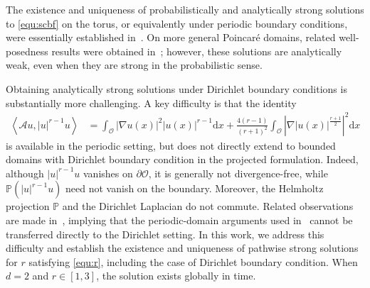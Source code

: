 \documentclass[11pt, reqno]{amsart}
\theoremstyle{definition}
\numberwithin{equation}{section}
\newcommand{\bb}{\mathbb}
\newcommand{\dx}{\mathrm{d}x}
\newcommand{\inpro}[2]{\left\langle#1,#2\right\rangle}
\newcommand{\abs}[1]{\left|{#1}\right|}
\begin{document}
The existence and uniqueness of probabilistically and analytically strong
solutions to \eqref{equ:scbf} on the torus, or equivalently under periodic
boundary conditions, were essentially established in~\cite{GaoLiu19b,LiuGao18}.
On more general Poincar\'e domains, related well-posedness results were
obtained in~\cite{KinCipMoh25, KinMoh23}; however, these solutions are
analytically weak, even when they are strong in the probabilistic sense. 

Obtaining analytically strong solutions under Dirichlet boundary conditions is substantially more challenging. A key difficulty is that the identity
\begin{align*}
	\inpro{\mathcal{A}u}{|u|^{r-1} u}
	&=
	\int_\mathscr{O} \abs{\nabla u(x)}^2 \abs{u(x)}^{r-1} \dx
	+
	\frac{4(r-1)}{(r+1)^2}
	\int_\mathscr{O}
	\abs{\nabla \abs{u(x)}^{\frac{r+1}{2}}}^2 \dx
\end{align*}
is available in the periodic setting, but does not directly extend to bounded domains with Dirichlet boundary condition in the projected formulation. Indeed, although $|u|^{r-1}u$ vanishes on $\partial\mathscr O$, it is generally not divergence-free, while $\bb{P}(|u|^{r-1}u)$ need not vanish on the boundary. Moreover, the Helmholtz projection $\bb{P}$ and the Dirichlet Laplacian do not commute. Related observations are made in~\cite{KinMoh23,LiKim24}, implying that the periodic-domain arguments used in~\cite{GaoLiu19,LiuGao18} cannot be transferred directly to the Dirichlet setting. 
In this work, we address this difficulty and establish the existence and uniqueness of pathwise strong solutions for $r$ satisfying \eqref{equ:r}, including the case of Dirichlet boundary condition. When $d=2$ and $r\in[1,3]$, the solution exists globally in time.
\end{document}
